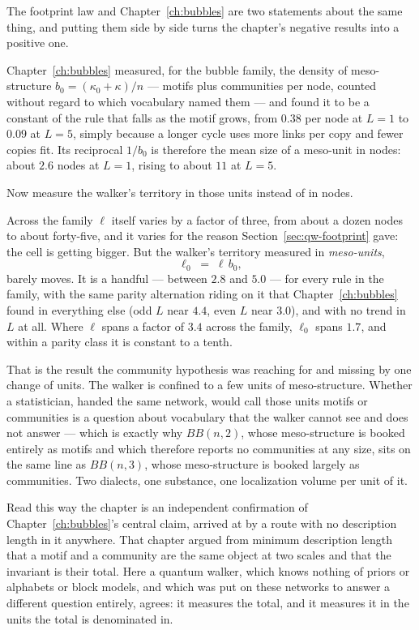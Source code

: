 The footprint law and Chapter~\ref{ch:bubbles} are two statements about the same
thing, and putting them side by side turns the chapter's negative results into a
positive one.

Chapter~\ref{ch:bubbles} measured, for the bubble family, the density of
meso-structure $b_0 = (\kappa_0+\kappa)/n$ --- motifs plus communities per node,
counted without regard to which vocabulary named them --- and found it to be a
constant of the rule that falls as the motif grows, from $0.38$ per node at $L=1$ to
$0.09$ at $L=5$, simply because a longer cycle uses more links per copy and fewer
copies fit. Its reciprocal $1/b_0$ is therefore the mean size of a meso-unit in
nodes: about $2.6$ nodes at $L=1$, rising to about $11$ at $L=5$.

Now measure the walker's territory in those units instead of in nodes.



\noindent Across the family $\ell$ itself varies by a factor of three, from about a
dozen nodes to about forty-five, and it varies for the reason
Section~\ref{sec:qw-footprint} gave: the cell is getting bigger. But the walker's
territory measured in \emph{meso-units},
\begin{equation}
  \ell_0 \;=\; \ell\,b_0 ,
  \label{eq:qw-ell0-def}
\end{equation}
barely moves. It is a handful --- between $2.8$ and $5.0$ --- for every rule in the
family, with the same parity alternation riding on it that Chapter~\ref{ch:bubbles}
found in everything else (odd $L$ near $4.4$, even $L$ near $3.0$), and with no trend
in $L$ at all. Where $\ell$ spans a factor of $3.4$ across the family, $\ell_0$ spans
$1.7$, and within a parity class it is constant to a tenth.

That is the result the community hypothesis was reaching for and missing by one
change of units. The walker is confined to a few units of meso-structure. Whether a
statistician, handed the same network, would call those units motifs or communities
is a question about vocabulary that the walker cannot see and does not answer ---
which is exactly why $BB(n,2)$, whose meso-structure is booked entirely as motifs and
which therefore reports no communities at any size, sits on the same line as
$BB(n,3)$, whose meso-structure is booked largely as communities. Two dialects, one
substance, one localization volume per unit of it.

Read this way the chapter is an independent confirmation of Chapter~\ref{ch:bubbles}'s
central claim, arrived at by a route with no description length in it anywhere. That
chapter argued from minimum description length that a motif and a community are the
same object at two scales and that the invariant is their total. Here a quantum
walker, which knows nothing of priors or alphabets or block models, and which was put
on these networks to answer a different question entirely, agrees: it measures the
total, and it measures it in the units the total is denominated in.

